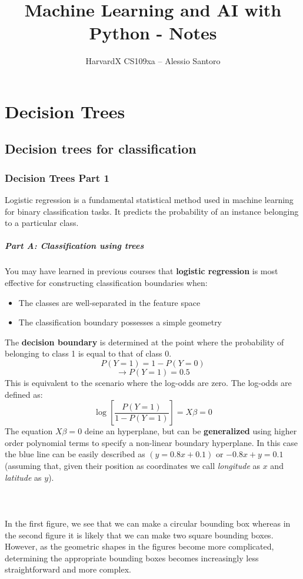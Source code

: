 \documentclass[11pt,a4paper]{report}
\author{HarvardX CS109xa -- Alessio Santoro}
\title{Machine Learning and AI with Python - Notes}
\begin{document}
\maketitle
\chapter{Decision Trees}
\section{Decision trees for classification}
\subsection{Decision Trees Part 1}

Logistic regression is a fundamental statistical method used in machine learning for binary classification tasks. It predicts the probability of an instance belonging to a particular class.

\paragraph{Part A: Classification using trees}
You may have learned in previous courses that \textbf{logistic regression} is most effective for constructing classification boundaries when:
\begin{itemize}
	\item The classes are well-separated in the feature space
	\item The classification boundary possesses a simple geometry
\end{itemize}
The \textbf{decision boundary} is determined at the point where the probability of belonging to class 1 is equal to that of class 0.
$$P(Y=1)=1-P(Y=0)$$
$$\rightarrow P(Y=1)=0.5$$
This is equivalent to the scenario where the log-odds are zero. The log-odds are defined as:  
$$\log\left[\frac{P(Y=1)}{1-P(Y=1)}\right]=X\beta=0$$
The equation $X\beta=0$ deine an hyperplane, but can be \textbf{generalized} using higher order polynomial terms to specify a non-linear boundary hyperplane. 
In this case the blue line can be easily described as $(y=0.8x+0.1)$ or $-0.8x+y=0.1$ (assuming that, given their position as coordinates we call \textit{longitude} as $x$ and \textit{latitude} as $y$).\\\\
\\\\
In the first figure, we see that we can make a circular bounding box whereas in the second figure it is likely that we can make two square bounding boxes. However, as the geometric shapes in the figures become more complicated, determining the appropriate bounding boxes becomes increasingly less straightforward and more complex.
\end{document}
